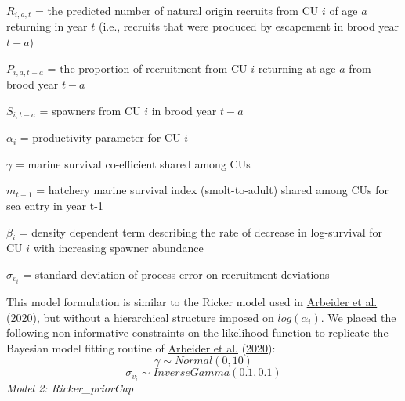 \documentclass[11pt]{book}
\begin{document}
\(R_{i,a,t}\) = the predicted number of natural origin recruits from CU \(i\) of age \(a\) returning in year \(t\) (i.e., recruits that were produced by escapement in brood year \(t-a\))

\(P_{i,a,t-a}\) = the proportion of recruitment from CU \(i\) returning at age \(a\) from brood year \(t-a\)

\(S_{i,t-a}\) = spawners from CU \(i\) in brood year \(t-a\)

\(\alpha_i\) = productivity parameter for CU \(i\)

\(\gamma\) = marine survival co-efficient shared among CUs

\(m_{t-1}\) = hatchery marine survival index (smolt-to-adult) shared among CUs for sea entry in year t-1

\(\beta_i\) = density dependent term describing the rate of decrease in log-survival for CU \(i\) with increasing spawner abundance

\(\sigma_{v_i}\) = standard deviation of process error on recruitment deviations

This model formulation is similar to the Ricker model used in \protect\hyperlink{ref-arbeiderInteriorFraserCoho2020}{Arbeider et al.} (\protect\hyperlink{ref-arbeiderInteriorFraserCoho2020}{2020}), but without a hierarchical structure imposed on \(log(\alpha_i)\). We placed the following non-informative constraints on the likelihood function to replicate the Bayesian model fitting routine of \protect\hyperlink{ref-arbeiderInteriorFraserCoho2020}{Arbeider et al.} (\protect\hyperlink{ref-arbeiderInteriorFraserCoho2020}{2020}):
\begin{equation}
  \gamma \sim Normal(0,10)
\end{equation} \begin{equation}
  \sigma_{v_i} \sim Inverse Gamma (0.1,0.1)
\end{equation}
\emph{Model 2: Ricker\_priorCap}
\end{document}
